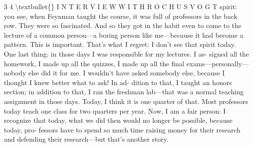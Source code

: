 \documentclass[10pt,oneside]{article}
\begin{document}
3 4 \textbackslash{}textbullet\{\} I N T E R V I E W  W I T H  R O C H U S  V O G T spirit: you see, when Feynman taught the course, it was full of professors in the back row. They were so fascinated. And so they got in the habit even to come to the lecture of a common person---a boring person like me---because it had become a pattern. This is important. That’s what I regret: I don’t see that spirit today. One last thing: in those days I was responsible for my lectures. I as- signed all the homework, I made up all the quizzes, I made up all the final exams---personally---nobody else did it for me. I wouldn’t have asked somebody else, because I thought I knew better what to ask! In ad- dition to that, I taught an honors section; in addition to that, I ran the freshman lab---that was a normal teaching assignment in those days. Today, I think it is one quarter of that. Most professors today teach one class for two quarters per year. Now, I am a fair person: I recognize that today, what we did then would no longer be possible, because today, pro- fessors have to spend so much time raising money for their research and defending their research---but that’s another story.\par

\clearpage
{}
\end{document}
